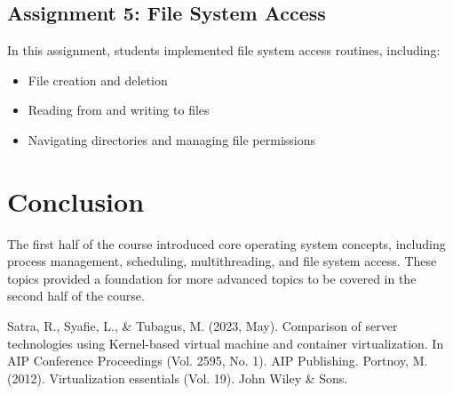 \documentclass[12pt]{article}
\begin{document}
\subsection{Assignment 5: File System Access}
In this assignment, students implemented file system access routines, including:
\begin{itemize}
    \item File creation and deletion
    \item Reading from and writing to files
    \item Navigating directories and managing file permissions
\end{itemize}

\section{Conclusion}
The first half of the course introduced core operating system concepts, including process management, scheduling, multithreading, and file system access. These topics provided a foundation for more advanced topics to be covered in the second half of the course.

\begin{thebibliography}
     Satra, R., Syafie, L., & Tubagus, M. (2023, May). Comparison of server technologies using Kernel-based virtual machine and container virtualization. In AIP Conference Proceedings (Vol. 2595, No. 1). AIP Publishing.
     Portnoy, M. (2012). Virtualization essentials (Vol. 19). John Wiley & Sons.
\end{thebibliography}
\end{document}
